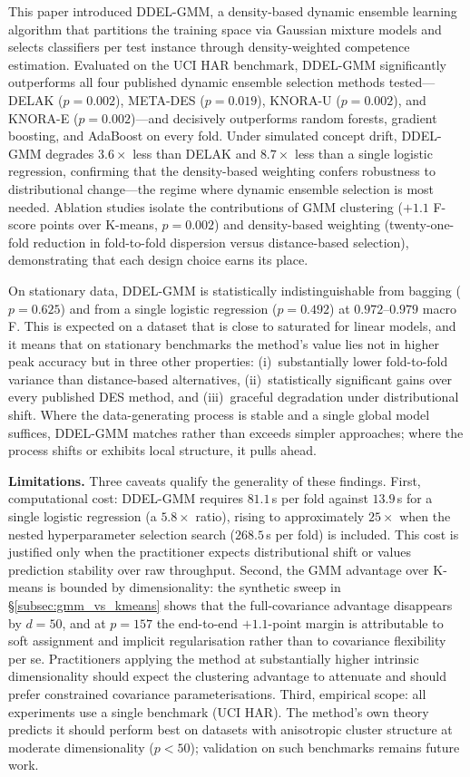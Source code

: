 \documentclass[lettersize,journal]{IEEEtran}
\begin{document}
	This paper introduced DDEL-GMM, a density-based dynamic ensemble learning algorithm that partitions the training space via Gaussian mixture models and selects classifiers per test instance through density-weighted competence estimation. Evaluated on the UCI HAR benchmark, DDEL-GMM significantly outperforms all four published dynamic ensemble selection methods tested---DELAK ($p = 0.002$), META-DES ($p = 0.019$), KNORA-U ($p = 0.002$), and KNORA-E ($p = 0.002$)---and decisively outperforms random forests, gradient boosting, and AdaBoost on every fold. Under simulated concept drift, DDEL-GMM degrades $3.6\times$ less than DELAK and $8.7\times$ less than a single logistic regression, confirming that the density-based weighting confers robustness to distributional change---the regime where dynamic ensemble selection is most needed. Ablation studies isolate the contributions of GMM clustering ($+1.1$ F-score points over K-means, $p = 0.002$) and density-based weighting (twenty-one-fold reduction in fold-to-fold dispersion versus distance-based selection), demonstrating that each design choice earns its place.
	
	On stationary data, DDEL-GMM is statistically indistinguishable from bagging ($p = 0.625$) and from a single logistic regression ($p = 0.492$) at $0.972$--$0.979$ macro F. This is expected on a dataset that is close to saturated for linear models, and it means that on stationary benchmarks the method's value lies not in higher peak accuracy but in three other properties: (i)~substantially lower fold-to-fold variance than distance-based alternatives, (ii)~statistically significant gains over every published DES method, and (iii)~graceful degradation under distributional shift. Where the data-generating process is stable and a single global model suffices, DDEL-GMM matches rather than exceeds simpler approaches; where the process shifts or exhibits local structure, it pulls ahead.
	
	\textbf{Limitations.} Three caveats qualify the generality of these findings. First, computational cost: DDEL-GMM requires $81.1$\,s per fold against $13.9$\,s for a single logistic regression (a $5.8\times$ ratio), rising to approximately $25\times$ when the nested hyperparameter selection search ($268.5$\,s per fold) is included. This cost is justified only when the practitioner expects distributional shift or values prediction stability over raw throughput. Second, the GMM advantage over K-means is bounded by dimensionality: the synthetic sweep in \S\ref{subsec:gmm_vs_kmeans} shows that the full-covariance advantage disappears by $d = 50$, and at $p = 157$ the end-to-end $+1.1$-point margin is attributable to soft assignment and implicit regularisation rather than to covariance flexibility per se. Practitioners applying the method at substantially higher intrinsic dimensionality should expect the clustering advantage to attenuate and should prefer constrained covariance parameterisations. Third, empirical scope: all experiments use a single benchmark (UCI HAR). The method's own theory predicts it should perform best on datasets with anisotropic cluster structure at moderate dimensionality ($p < 50$); validation on such benchmarks remains future work.
	
\end{document}
